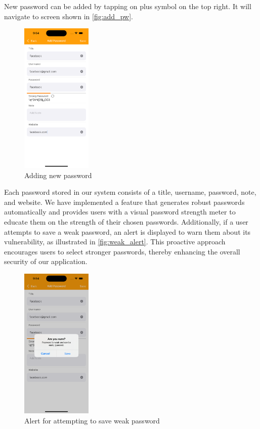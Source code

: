 \documentclass[10pt, titlepage]{article}
\begin{document}
New password can be added by tapping on plus symbol on the top right. It will navigate to screen shown in \autoref{fig:add_pw}.
\begin{figure}[H]
	\centering
	\vspace{-0.25em}
	\includegraphics[width=0.3\textwidth]{img/add_pw}
	\vspace{-0.75em}
	\caption{Adding new password}
	\label{fig:add_pw}
	\vspace{-0.75em}
\end{figure}

Each password stored in our system consists of a title, username, password, note, and website. We have implemented a feature that generates robust passwords automatically and provides users with a visual password strength meter to educate them on the strength of their chosen passwords. Additionally, if a user attempts to save a weak password, an alert is displayed to warn them about its vulnerability, as illustrated in \autoref{fig:weak_alert}. This proactive approach encourages users to select stronger passwords, thereby enhancing the overall security of our application.
\begin{figure}[H]
	\centering
	\vspace{-0.25em}
	\includegraphics[width=0.3\textwidth]{img/weak_alert}
	\vspace{-0.75em}
	\caption{Alert for attempting to save weak password}
	\label{fig:weak_alert}
	\vspace{-0.75em}
\end{figure}
\end{document}
